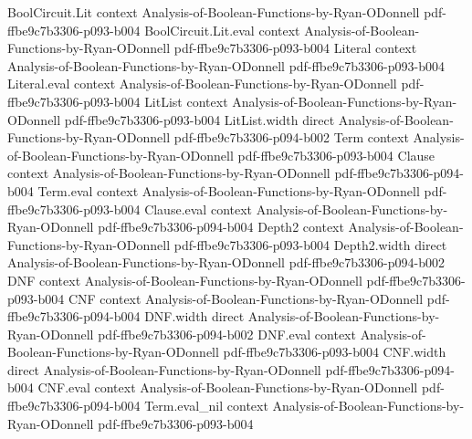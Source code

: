 \begin{theorem}
\leanok
{}
\proofstep
  {BoolCircuit.Lit}
  {context}
  {Analysis-of-Boolean-Functions-by-Ryan-ODonnell}
  {pdf-ffbe9c7b3306-p093-b004}
\proofstep
  {BoolCircuit.Lit.eval}
  {context}
  {Analysis-of-Boolean-Functions-by-Ryan-ODonnell}
  {pdf-ffbe9c7b3306-p093-b004}
\proofstep
  {Literal}
  {context}
  {Analysis-of-Boolean-Functions-by-Ryan-ODonnell}
  {pdf-ffbe9c7b3306-p093-b004}
\proofstep
  {Literal.eval}
  {context}
  {Analysis-of-Boolean-Functions-by-Ryan-ODonnell}
  {pdf-ffbe9c7b3306-p093-b004}
\proofstep
  {LitList}
  {context}
  {Analysis-of-Boolean-Functions-by-Ryan-ODonnell}
  {pdf-ffbe9c7b3306-p093-b004}
\proofstep
  {LitList.width}
  {direct}
  {Analysis-of-Boolean-Functions-by-Ryan-ODonnell}
  {pdf-ffbe9c7b3306-p094-b002}
\proofstep
  {Term}
  {context}
  {Analysis-of-Boolean-Functions-by-Ryan-ODonnell}
  {pdf-ffbe9c7b3306-p093-b004}
\proofstep
  {Clause}
  {context}
  {Analysis-of-Boolean-Functions-by-Ryan-ODonnell}
  {pdf-ffbe9c7b3306-p094-b004}
\proofstep
  {Term.eval}
  {context}
  {Analysis-of-Boolean-Functions-by-Ryan-ODonnell}
  {pdf-ffbe9c7b3306-p093-b004}
\proofstep
  {Clause.eval}
  {context}
  {Analysis-of-Boolean-Functions-by-Ryan-ODonnell}
  {pdf-ffbe9c7b3306-p094-b004}
\proofstep
  {Depth2}
  {context}
  {Analysis-of-Boolean-Functions-by-Ryan-ODonnell}
  {pdf-ffbe9c7b3306-p093-b004}
\proofstep
  {Depth2.width}
  {direct}
  {Analysis-of-Boolean-Functions-by-Ryan-ODonnell}
  {pdf-ffbe9c7b3306-p094-b002}
\proofstep
  {DNF}
  {context}
  {Analysis-of-Boolean-Functions-by-Ryan-ODonnell}
  {pdf-ffbe9c7b3306-p093-b004}
\proofstep
  {CNF}
  {context}
  {Analysis-of-Boolean-Functions-by-Ryan-ODonnell}
  {pdf-ffbe9c7b3306-p094-b004}
\proofstep
  {DNF.width}
  {direct}
  {Analysis-of-Boolean-Functions-by-Ryan-ODonnell}
  {pdf-ffbe9c7b3306-p094-b002}
\proofstep
  {DNF.eval}
  {context}
  {Analysis-of-Boolean-Functions-by-Ryan-ODonnell}
  {pdf-ffbe9c7b3306-p093-b004}
\proofstep
  {CNF.width}
  {direct}
  {Analysis-of-Boolean-Functions-by-Ryan-ODonnell}
  {pdf-ffbe9c7b3306-p094-b004}
\proofstep
  {CNF.eval}
  {context}
  {Analysis-of-Boolean-Functions-by-Ryan-ODonnell}
  {pdf-ffbe9c7b3306-p094-b004}
\proofstep
  {Term.eval_nil}
  {context}
  {Analysis-of-Boolean-Functions-by-Ryan-ODonnell}
  {pdf-ffbe9c7b3306-p093-b004}

\end{theorem}
